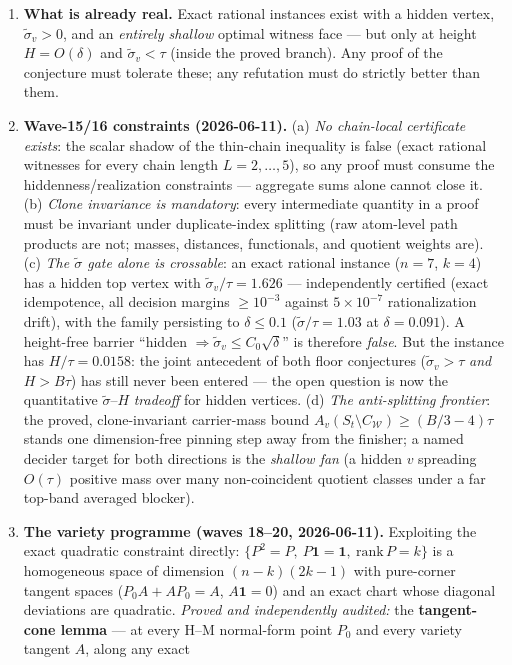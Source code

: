 \documentclass[11pt]{article}
\theoremstyle{plain}
\theoremstyle{definition}
\theoremstyle{remark}
\newcommand{\W}{\mathcal W}
\newcommand{\sigt}{\widetilde{\sigma}}
\begin{document}
\begin{enumerate}
Baake--Sumner normal form, the audited canonical W-free restatement).
\item \textbf{What is already real.} Exact rational instances exist with a hidden vertex,
$\sigt_v>0$, and an \emph{entirely shallow} optimal witness face --- but only at height
$H=O(\delta)$ and $\sigt_v<\tau$ (inside the proved branch). Any proof of the conjecture
must tolerate these; any refutation must do strictly better than them.
\item \textbf{Wave-15/16 constraints (2026-06-11).} (a) \emph{No chain-local
certificate exists}: the scalar shadow of the thin-chain inequality is false (exact
rational witnesses for every chain length $L=2,\dots,5$), so any proof must consume the
hiddenness/realization constraints --- aggregate sums alone cannot close it.
(b) \emph{Clone invariance is mandatory}: every intermediate quantity in a proof must be
invariant under duplicate-index splitting (raw atom-level path products are not;
masses, distances, functionals, and quotient weights are). (c) \emph{The $\sigt$ gate alone is crossable}: an exact rational instance ($n=7$,
$k=4$) has a hidden top vertex with $\sigt_v/\tau=1.626$ --- independently certified
(exact idempotence, all decision margins $\ge10^{-3}$ against $5\times10^{-7}$
rationalization drift), with the family persisting to $\delta\le0.1$
($\sigt/\tau=1.03$ at $\delta=0.091$). A height-free barrier
``hidden $\Rightarrow\sigt_v\le C_0\sqrt\delta$'' is therefore \emph{false}. But the
instance has $H/\tau=0.0158$: the joint antecedent of both floor conjectures
($\sigt_v>\tau$ \emph{and} $H>B\tau$) has still never been entered --- the open
question is now the quantitative $\sigt$--$H$ \emph{tradeoff} for hidden vertices. (d) \emph{The anti-splitting frontier}: the proved, clone-invariant
carrier-mass bound $A_v(S_t\setminus C_{\W})\ge(B/3-4)\tau$ stands one dimension-free
pinning step away from the finisher; a named decider target for both directions is the
\emph{shallow fan} (a hidden $v$ spreading $O(\tau)$ positive mass over many
non-coincident quotient classes under a far top-band averaged blocker).
\item \textbf{The variety programme (waves 18--20, 2026-06-11).} Exploiting the exact
quadratic constraint directly: $\{P^2=P,\ P\mathbf1=\mathbf1,\ \mathrm{rank}\,P=k\}$ is
a homogeneous space of dimension $(n-k)(2k-1)$ with pure-corner tangent spaces
($P_0A+AP_0=A$, $A\mathbf1=0$) and an exact chart whose diagonal deviations are
quadratic. \emph{Proved and independently audited:} the \textbf{tangent-cone lemma} ---
at every H--M normal-form point $P_0$ and every variety tangent $A$, along any exact

\end{enumerate}
\end{document}
